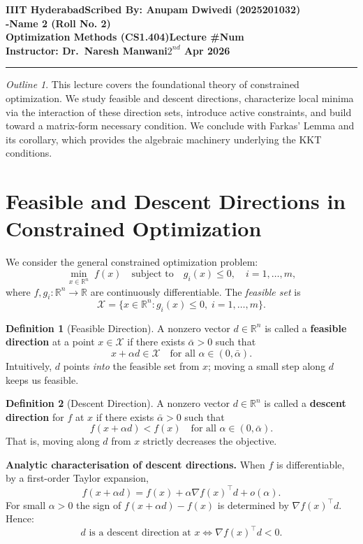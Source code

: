 \documentclass[11pt]{article}
\theoremstyle{definition}
\newtheorem{definition}{Definition}
\theoremstyle{plain}
\theoremstyle{remark}
\newcommand{\myname}{Scribed By: Anupam Dwivedi (2025201032)}
\newcommand{\mynami}{Name 2 (Roll No. 2)}
\newcommand{\assignment}{Lecture \#Num}
\newcommand{\duedate}{$2^{nd}$ Apr 2026}
\newtheorem*{thmtype}{Outline}
\newcommand{\statement}{
This lecture covers the foundational theory of constrained optimization. We study feasible and descent directions, characterize local minima via the interaction of these direction sets, introduce active constraints, and build toward a matrix-form necessary condition. We conclude with Farkas' Lemma and its corollary, which provides the algebraic machinery underlying the KKT conditions.
}
\begin{document}
\textbf{IIIT Hyderabad}\hfill\textbf{\myname}\\[0.01in]
\textbf{-}\hfill\textbf{\mynami}\\[0.01in]
\textbf{Optimization Methods (CS1.404)}\hfill\textbf{\assignment}\\[0.01in]
\textbf{Instructor: Dr.\ Naresh Manwani}\hfill\textbf{\duedate}\\
\smallskip\hrule\bigskip

\begin{thmtype}
\statement
\end{thmtype}

\section{Feasible and Descent Directions in Constrained Optimization}

We consider the general constrained optimization problem:
\begin{equation}
  \min_{x \in \mathbb{R}^n} \; f(x) \quad \text{subject to} \quad g_i(x) \leq 0, \quad i = 1, \ldots, m,
  \label{eq:prob}
\end{equation}
where $f, g_i : \mathbb{R}^n \to \mathbb{R}$ are continuously differentiable. The \emph{feasible set} is
\[
  \mathcal{X} = \{x \in \mathbb{R}^n : g_i(x) \leq 0, \; i = 1, \ldots, m\}.
\]

\begin{definition}[Feasible Direction]
  A nonzero vector $d \in \mathbb{R}^n$ is called a \textbf{feasible direction} at a point $x \in \mathcal{X}$ if there exists $\bar{\alpha} > 0$ such that
  \[
    x + \alpha d \in \mathcal{X} \quad \text{for all } \alpha \in (0, \bar{\alpha}).
  \]
  Intuitively, $d$ points \emph{into} the feasible set from $x$; moving a small step along $d$ keeps us feasible.
\end{definition}

\begin{definition}[Descent Direction]
  A nonzero vector $d \in \mathbb{R}^n$ is called a \textbf{descent direction} for $f$ at $x$ if there exists $\bar{\alpha} > 0$ such that
  \[
    f(x + \alpha d) < f(x) \quad \text{for all } \alpha \in (0, \bar{\alpha}).
  \]
  That is, moving along $d$ from $x$ strictly decreases the objective.
\end{definition}

\textbf{Analytic characterisation of descent directions.} When $f$ is differentiable, by a first-order Taylor expansion,
\[
  f(x + \alpha d) = f(x) + \alpha \nabla f(x)^\top d + o(\alpha).
\]
For small $\alpha > 0$ the sign of $f(x+\alpha d) - f(x)$ is determined by $\nabla f(x)^\top d$. Hence:
\[
  d \text{ is a descent direction at } x \iff \nabla f(x)^\top d < 0.
\]
\end{document}
